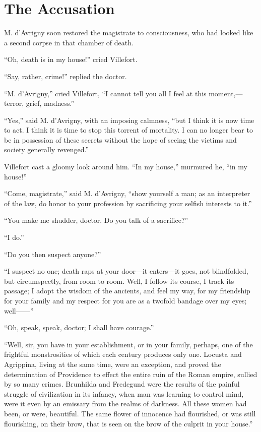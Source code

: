 \chapter{The Accusation}

M. d’Avrigny soon restored the magistrate to consciousness, who had
looked like a second corpse in that chamber of death.

“Oh, death is in my house!” cried Villefort.

“Say, rather, crime!” replied the doctor.

“M. d’Avrigny,” cried Villefort, “I cannot tell you all I feel at this
moment,—terror, grief, madness.”

“Yes,” said M. d’Avrigny, with an imposing calmness, “but I think it is
now time to act. I think it is time to stop this torrent of mortality.
I can no longer bear to be in possession of these secrets without the
hope of seeing the victims and society generally revenged.”

Villefort cast a gloomy look around him. “In my house,” murmured he,
“in my house!”

“Come, magistrate,” said M. d’Avrigny, “show yourself a man; as an
interpreter of the law, do honor to your profession by sacrificing your
selfish interests to it.”

“You make me shudder, doctor. Do you talk of a sacrifice?”

“I do.”

“Do you then suspect anyone?”

“I suspect no one; death raps at your door—it enters—it goes, not
blindfolded, but circumspectly, from room to room. Well, I follow its
course, I track its passage; I adopt the wisdom of the ancients, and
feel my way, for my friendship for your family and my respect for you
are as a twofold bandage over my eyes; well——”

“Oh, speak, speak, doctor; I shall have courage.”

“Well, sir, you have in your establishment, or in your family, perhaps,
one of the frightful monstrosities of which each century produces only
one. Locusta and Agrippina, living at the same time, were an exception,
and proved the determination of Providence to effect the entire ruin of
the Roman empire, sullied by so many crimes. Brunhilda and Fredegund
were the results of the painful struggle of civilization in its
infancy, when man was learning to control mind, were it even by an
emissary from the realms of darkness. All these women had been, or
were, beautiful. The same flower of innocence had flourished, or was
still flourishing, on their brow, that is seen on the brow of the
culprit in your house.”


